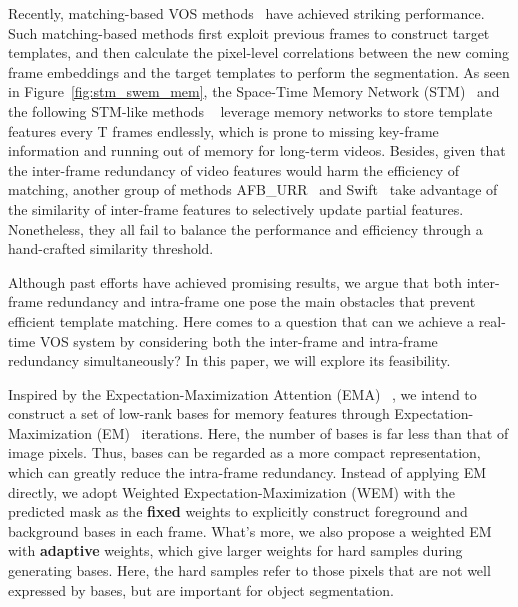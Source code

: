 Recently, matching-based VOS methods~\cite{chen2018blazingly,hu2018videomatch,Voigtlaender_2019_CVPR,lu_2020_ECCV,yang_2020_ECCV,seong_2020_ECCV,liang2020video, hu2021learning,xie2021efficient,wang2021swiftnet,seong2021hierarchical,cheng2021stcn} have achieved striking performance. Such matching-based methods first exploit previous frames to construct target templates, and then calculate the pixel-level correlations between the new coming frame embeddings and the target templates to perform the segmentation.
As seen in Figure~\ref{fig:stm_swem_mem}, the Space-Time Memory Network (STM)~\cite{Oh_2019_ICCV} and the following STM-like methods ~\cite{seong_2020_ECCV,hu2021learning,xie2021efficient,seong2021hierarchical,cheng2021stcn} leverage memory networks to store template features every T frames endlessly, which is prone to missing key-frame information and running out of memory for long-term videos. Besides, given that the inter-frame redundancy of video features would harm the efficiency of matching, another group of methods AFB\_URR~\cite{liang2020video} and Swift~\cite{wang2021swiftnet} take advantage of the similarity of inter-frame features to selectively update partial features. Nonetheless, they all fail to balance the performance and efficiency through a hand-crafted similarity threshold. 

Although past efforts have achieved promising results, we argue that both inter-frame redundancy and intra-frame one pose the main obstacles that prevent efficient template matching.
Here comes to a question that can we achieve a real-time VOS system by considering both the inter-frame and intra-frame redundancy simultaneously? In this paper, we will explore its feasibility. 

Inspired by the Expectation-Maximization Attention (EMA) ~\cite{Li_2019_ICCV}, we intend to construct a set of low-rank bases for memory features through Expectation-Maximization (EM)~\cite{em} iterations. Here, the number of bases is far less than that of image pixels. Thus, bases can be regarded as a more compact representation, which can greatly reduce the intra-frame redundancy. Instead of applying EM directly, we adopt Weighted Expectation-Maximization (WEM) with the predicted mask as the \textbf{fixed} weights to explicitly construct foreground and background bases in each frame. What's more, we also propose a weighted EM with \textbf{adaptive} weights, which give larger weights for hard samples during generating bases. Here, the hard samples refer to those pixels that are not well expressed by bases, but are important for object segmentation.

